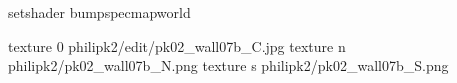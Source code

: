 setshader bumpspecmapworld

texture 0 philipk2/edit/pk02_wall07b_C.jpg
texture n philipk2/pk02_wall07b_N.png
texture s philipk2/pk02_wall07b_S.png

